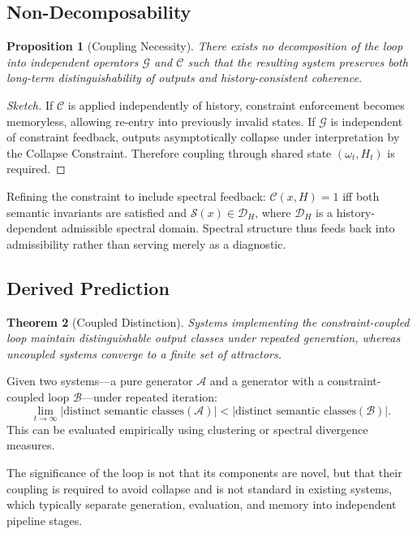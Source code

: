 \documentclass[12pt, a4paper]{article}
\theoremstyle{plain}
\newtheorem{theorem}{Theorem}[section]
\newtheorem{proposition}[theorem]{Proposition}
\theoremstyle{definition}
\theoremstyle{remark}
\begin{document}
\subsection{Non-Decomposability}

\begin{proposition}[Coupling Necessity]
There exists no decomposition of the loop into independent operators $\mathcal{G}$ and $\mathcal{C}$ such that the resulting system preserves both long-term distinguishability of outputs and history-consistent coherence.
\end{proposition}

\begin{proof}[Sketch]
If $\mathcal{C}$ is applied independently of history, constraint enforcement becomes memoryless, allowing re-entry into previously invalid states. If $\mathcal{G}$ is independent of constraint feedback, outputs asymptotically collapse under interpretation by the Collapse Constraint. Therefore coupling through shared state $(\omega_t, H_t)$ is required.
\end{proof}

Refining the constraint to include spectral feedback: $\mathcal{C}(x, H) = 1$ iff both semantic invariants are satisfied and $\mathcal{S}(x) \in \mathcal{D}_H$, where $\mathcal{D}_H$ is a history-dependent admissible spectral domain. Spectral structure thus feeds back into admissibility rather than serving merely as a diagnostic.

\subsection{Derived Prediction}

\begin{theorem}[Coupled Distinction]
Systems implementing the constraint-coupled loop maintain distinguishable output classes under repeated generation, whereas uncoupled systems converge to a finite set of attractors.
\end{theorem}

Given two systems---a pure generator $\mathcal{A}$ and a generator with a constraint-coupled loop $\mathcal{B}$---under repeated iteration:
\[
\lim_{t \to \infty} |\text{distinct semantic classes}(\mathcal{A})| < |\text{distinct semantic classes}(\mathcal{B})|.
\]
This can be evaluated empirically using clustering or spectral divergence measures.

The significance of the loop is not that its components are novel, but that their coupling is required to avoid collapse and is not standard in existing systems, which typically separate generation, evaluation, and memory into independent pipeline stages.
\end{document}
